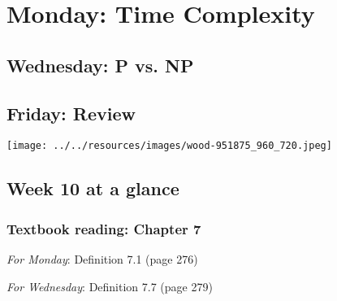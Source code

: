 


\section*{Monday: Time Complexity}


    
\newpage
\subsection*{Wednesday: P vs. NP}




\newpage
\subsection*{Friday: Review}



\newpage


\begin{center}
\texttt{[image: ../../resources/images/wood-951875\_960\_720.jpeg]}
\end{center}



\subsection*{Week 10 at a glance}

\subsubsection*{Textbook reading: Chapter 7}

{\it For Monday}: Definition 7.1 (page 276)

{\it For Wednesday}: Definition 7.7 (page 279)


